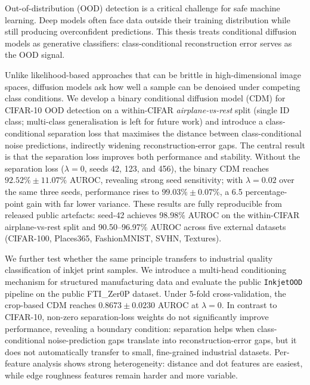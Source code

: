 \cleardoubleoddpage
\begin{abstract*}
\begingroup
\enlargethispage{1\baselineskip}
\fontsize{10pt}{12pt}\selectfont
Out-of-distribution (OOD) detection is a critical challenge for safe machine learning. Deep models often face data outside their training distribution while still producing overconfident predictions. This thesis treats conditional diffusion models as generative classifiers: class-conditional reconstruction error serves as the OOD signal.

Unlike likelihood-based approaches that can be brittle in high-dimensional image spaces, diffusion models ask how well a sample can be denoised under competing class conditions. We develop a binary conditional diffusion model (CDM) for CIFAR-10 OOD detection on a within-CIFAR \emph{airplane-vs-rest} split (single ID class; multi-class generalisation is left for future work) and introduce a class-conditional separation loss that maximises the distance between class-conditional noise predictions, indirectly widening reconstruction-error gaps. The central result is that the separation loss improves both performance and stability. Without the separation loss ($\lambda=0$, seeds 42, 123, and 456), the binary CDM reaches $92.52\% \pm 11.07\%$ AUROC, revealing strong seed sensitivity; with $\lambda=0.02$ over the same three seeds, performance rises to $99.03\% \pm 0.07\%$, a 6.5 percentage-point gain with far lower variance. These results are fully reproducible from released public artefacts: seed-42 achieves 98.98\% AUROC on the within-CIFAR airplane-vs-rest split and 90.50--96.97\% AUROC across five external datasets (CIFAR-100, Places365, FashionMNIST, SVHN, Textures).

We further test whether the same principle transfers to industrial quality classification of inkjet print samples. We introduce a multi-head conditioning mechanism for structured manufacturing data and evaluate the public \texttt{InkjetOOD} pipeline on the public FTI\_Zer0P dataset. Under 5-fold cross-validation, the crop-based CDM reaches $0.8673 \pm 0.0230$ AUROC at $\lambda=0$. In contrast to CIFAR-10, non-zero separation-loss weights do not significantly improve performance, revealing a boundary condition: separation helps when class-conditional noise-prediction gaps translate into reconstruction-error gaps, but it does not automatically transfer to small, fine-grained industrial datasets. Per-feature analysis shows strong heterogeneity: distance and dot features are easiest, while edge roughness features remain harder and more variable.


\end{abstract*}

